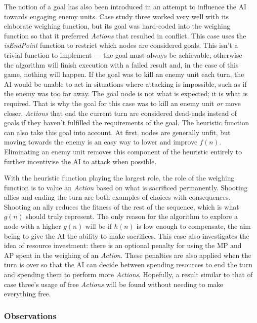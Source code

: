 \documentclass[11pt, a4paper]{report}
\begin{document}
The notion of a goal has also been introduced in an attempt to influence the AI towards engaging enemy units. Case study three worked very well with its elaborate weighing function, but its goal was hard-coded into the weighing function so that it preferred \emph{Actions} that resulted in conflict. This case uses the \emph{isEndPoint} function to restrict which nodes are considered goals. This isn't a trivial function to implement --- the goal must always be achievable, otherwise the algorithm will finish execution with a failed result and, in the case of this game, nothing will happen. If the goal was to kill an enemy unit each turn, the AI would be unable to act in situations where attacking is impossible, such as if the enemy was too far away. The goal node is not what is expected; it is what is required. That is why the goal for this case was to kill an enemy unit \emph{or} move closer. \emph{Actions} that end the current turn are considered dead-ends instead of goals if they haven't fulfilled the requirements of the goal. The heuristic function can also take this goal into account. At first, nodes are generally unfit, but moving towards the enemy is an easy way to lower and improve $f(n)$. Eliminating an enemy unit removes this component of the heuristic entirely to further incentivise the AI to attack when possible. 

With the heuristic function playing the largest role, the role of the weighing function is to value an \emph{Action} based on what is sacrificed permanently. Shooting allies and ending the turn are both examples of choices with consequences. Shooting an ally reduces the fitness of the rest of the sequence, which is what $g(n)$ should truly represent. The only reason for the algorithm to explore a node with a higher $g(n)$ will be if $h(n)$ is low enough to compensate, the aim being to give the AI the ability to make sacrifices. This case also investigates the idea of resource investment: there is an optional penalty for using the MP and AP spent in the weighing of an \emph{Action}. These penalties are also applied when the turn is over so that the AI can decide between spending resources to end the turn and spending them to perform more \emph{Actions}. Hopefully, a result similar to that of case three's usage of free \emph{Actions} will be found without needing to make everything free.

\subsubsection{Observations}
\end{document}
